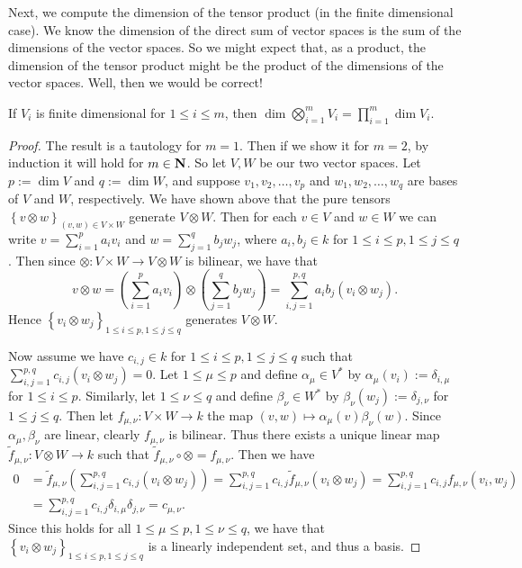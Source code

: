 Next, we compute the dimension of the tensor product (in the finite
dimensional case). We know the dimension of the direct sum of vector
spaces is the sum of the dimensions of the vector spaces. So we might
expect that, as a product, the dimension of the tensor product might
be the product of the dimensions of the vector spaces. Well, then we
would be correct!

\begin{pro} \label{dimten} If $V_i$ is finite dimensional for $1 \le i
  \le m$, then $\dim \bigotimes_{i=1}^m V_i = \prod_{i=1}^m \dim V_i$.
  \begin{proof}
    The result is a tautology for $m = 1$. Then if we show it for $m =
    2$, by induction it will hold for $m \in \boldsymbol{\mathbf{N}}$. So let $V,W$ be our
    two vector spaces. Let $p := \dim V$ and $q := \dim W$, and
    suppose $v_1,v_2,\ldots,v_p$ and $w_1,w_2,\ldots,w_q$ are bases of
    $V$ and $W$, respectively. We have shown above that the pure
    tensors $\left\{v \otimes w\right\}_{(v,w) \in V \times W}$
    generate $V \otimes W$. Then for each $v \in V$ and $w \in W$ we
    can write $v = \sum_{i=1}^p a_i v_i$ and $w = \sum_{j=1}^q b_j
    w_j$, where $a_i,b_j\in k$ for $1 \le i \le p, 1 \le j \le
    q$. Then since $\otimes : V \times W \to V \otimes W$ is bilinear,
    we have that
    \[ v \otimes w = \left(\sum_{i=1}^p a_i v_i\right) \otimes
    \left(\sum_{j=1}^q b_j w_j\right) =\sum_{i,j=1}^{p,q} a_ib_j (v_i
    \otimes w_j). \] Hence $\left\{v_i \otimes w_j\right\}_{1 \le i
      \le p, 1 \le j \le q}$ generates $V \otimes W$.

    Now assume we have $c_{i,j} \in k$ for $1 \le i \le p, 1 \le j \le
    q$ such that $\sum_{i,j=1}^{p,q} c_{i,j} (v_i \otimes w_j) =
    0$. Let $1 \le \mu \le p$ and define $\alpha_\mu \in V^*$ by
    $\alpha_\mu(v_i) := \delta_{i,\mu}$ for $1 \le i \le
    p$. Similarly, let $1 \le \nu \le q$ and define $\beta_\nu \in
    W^*$ by $\beta_\nu(w_j) := \delta_{j,\nu}$ for $1 \le j \le
    q$. Then let $f_{\mu,\nu} : V \times W \to k$ the map $(v,w)
    \mapsto \alpha_\mu(v)\beta_\nu(w)$. Since $\alpha_\mu,\beta_\nu$
    are linear, clearly $f_{\mu,\nu}$ is bilinear. Thus there exists a
    unique linear map $\tilde f_{\mu,\nu} : V \otimes W \to k$ such
    that $\tilde f_{\mu,\nu} \circ \otimes = f_{\mu,\nu}$. Then we
    have
    \begin{align*}
      0 &= \tilde f_{\mu,\nu}\left(\sum_{i,j=1}^{p,q} c_{i,j} (v_i
        \otimes w_j)\right) = \sum_{i,j=1}^{p,q} c_{i,j} \tilde
      f_{\mu,\nu}(v_i \otimes w_j) =\sum_{i,j=1}^{p,q} c_{i,j}
      f_{\mu,\nu}(v_i,w_j) \\ &=\sum_{i,j=1}^{p,q} c_{i,j}
      \delta_{i,\mu}\delta_{j,\nu} = c_{\mu,\nu}.
    \end{align*}
    Since this holds for all $1 \le \mu \le p, 1 \le \nu \le q$, we
    have that $\left\{v_i \otimes w_j\right\}_{1 \le i \le p, 1 \le j
      \le q}$ is a linearly independent set, and thus a basis.
  \end{proof}
\end{pro}

